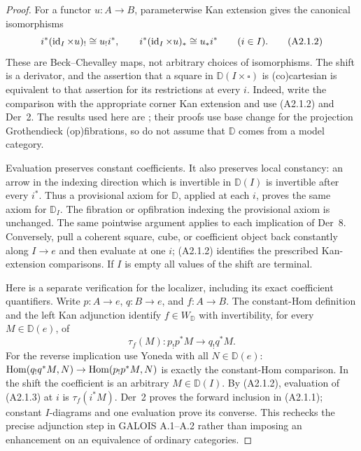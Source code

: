 \begin{proof}
For a functor $u:A\to B$, parameterwise Kan extension gives the canonical
isomorphisms
\[
 i^*(\operatorname{id}_I\times u)_!\cong u_!i^*,\qquad
 i^*(\operatorname{id}_I\times u)_*\cong u_*i^* \qquad(i\in I).
 \tag{A2.1.2}
\]
These are Beck--Chevalley maps, not arbitrary choices of isomorphisms. The
shift is a derivator, and the assertion that a square in $\mathbb D(I\times
\square)$ is (co)cartesian is equivalent to that assertion for its restrictions
at every $i$. Indeed, write the comparison with the appropriate corner Kan
extension and use (A2.1.2) and Der~2. The results used here are
\cite[Theorem~1.31 and Proposition~2.6]{A2GrothPreprint}; their proofs use
base change for the projection Grothendieck (op)fibrations, so do not assume
that $\mathbb D$ comes from a model category.

Evaluation preserves constant coefficients. It also preserves local
constancy: an arrow in the indexing direction which is invertible in
$\mathbb D(I)$ is invertible after every $i^*$. Thus a provisional axiom for
$\mathbb D$, applied at each $i$, proves the same axiom for $\mathbb D_I$.
The fibration or opfibration indexing the provisional axiom is unchanged.
The same pointwise argument applies to each implication of Der~8. Conversely,
pull a coherent square, cube, or coefficient object back constantly along
$I\to e$ and then evaluate at one $i$; (A2.1.2) identifies the prescribed
Kan-extension comparisons. If $I$ is empty all values of the shift are terminal.

Here is a separate verification for the localizer, including its exact
coefficient quantifiers. Write $p:A\to e$, $q:B\to e$, and $f:A\to B$.
The constant-Hom definition and the left Kan adjunction identify
$f\in W_{\mathbb D}$ with invertibility, for every $M\in\mathbb D(e)$, of
\[
 \tau_f(M):p_!p^*M\longrightarrow q_!q^*M.
 \tag{A2.1.3}
\]
For the reverse implication use Yoneda with all $N\in\mathbb D(e)$:
$\operatorname{Hom}(q_!q^*M,N)\to\operatorname{Hom}(p_!p^*M,N)$ is exactly the constant-Hom
comparison. In the shift the coefficient is an arbitrary $M\in\mathbb D(I)$.
By (A2.1.2), evaluation of (A2.1.3) at $i$ is $\tau_f(i^*M)$.
Der~2 proves the forward inclusion in (A2.1.1); constant $I$-diagrams
and one evaluation prove its converse. This rechecks the precise adjunction
step in GALOIS A.1--A.2 rather than imposing an enhancement on an equivalence
of ordinary categories.
\end{proof}

